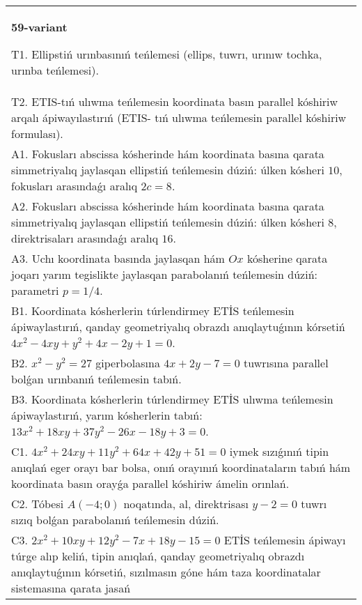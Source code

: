 \documentclass{article}
\begin{document}
\begin{tabular}{m{17cm}}
\textbf{59-variant}
\newline

T1. Ellipstiń urınbasınıń teńlemesi (ellips, tuwrı, urınıw tochka, urınba teńlemesi).\\

T2. ETIS-tıń ulıwma teńlemesin koordinata basın parallel kóshiriw arqalı ápiwayılastırıń (ETIS- tıń ulıwma teńlemesin parallel kóshiriw formulası).\\

A1. Fokusları abscissa kósherinde hám koordinata basına qarata simmetriyalıq jaylasqan ellipstiń teńlemesin dúziń: úlken kósheri $10$, fokusları arasındaǵı aralıq $2 c=8$.\\

A2. Fokusları abscissa kósherinde hám koordinata basına qarata simmetriyalıq jaylasqan ellipstiń teńlemesin dúziń: úlken kósheri $8$, direktrisaları arasındaǵı aralıq $16$.\\

A3. Uchı koordinata basında jaylasqan hám $Ox$ kósherine qarata joqarı yarım tegislikte jaylasqan parabolanıń teńlemesin dúziń: parametri $p=1/4$.\\

B1. Koordinata kósherlerin túrlendirmey ETİS teńlemesin ápiwaylastırıń, qanday geometriyalıq obrazdı anıqlaytuǵının kórsetiń $4x^{2} - 4xy + y^{2} + 4x - 2y + 1 = 0$.  \\

B2. $x^{2} - y^{2} = 27$ giperbolasına $4x + 2y - 7 = 0$ tuwrısına parallel bolǵan urınbanıń teńlemesin tabıń.  \\

B3. Koordinata kósherlerin túrlendirmey ETİS ulıwma teńlemesin ápiwaylastırıń, yarım kósherlerin tabıń: $13x^{2} + 18xy + 37y^{2} - 26x - 18y + 3 = 0$.  \\

C1. $4x^{2} + 24xy + 11y^{2} + 64x + 42y + 51 = 0$ iymek sızıǵınıń tipin anıqlań eger orayı bar bolsa, onıń orayınıń koordinataların tabıń hám koordinata basın orayǵa parallel kóshiriw ámelin orınlań.  \\

C2. Tóbesi $A(-4;0)$ noqatında, al, direktrisası $y - 2 = 0$ tuwrı sızıq bolǵan parabolanıń teńlemesin dúziń.\\

C3. $2x^{2} + 10xy + 12y^{2} - 7x + 18y - 15 = 0$ ETİS teńlemesin ápiwayı túrge alıp keliń, tipin anıqlań, qanday geometriyalıq obrazdı anıqlaytuǵının kórsetiń, sızılmasın góne hám taza koordinatalar sistemasına qarata jasań  \\

\end{tabular}
\vspace{1cm}
\end{document}
